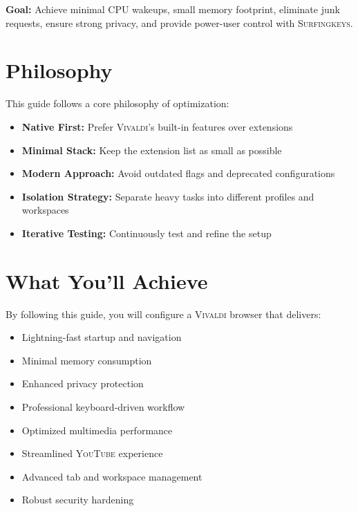 \documentclass[11pt,a4paper,oneside]{book}
\newcommand{\vivaldi}{\textsc{Vivaldi}}
\newcommand{\youtube}{\textsc{YouTube}}
\newcommand{\surfingkeys}{\textsc{Surfingkeys}}
\begin{document}
\begin{tipbox}
\textbf{Goal:} Achieve minimal CPU wakeups, small memory footprint, eliminate junk requests, ensure strong privacy, and provide power-user control with \surfingkeys{}.
\end{tipbox}

\section{Philosophy}

This guide follows a core philosophy of optimization:

\begin{itemize}
    \item \textbf{Native First:} Prefer \vivaldi{}'s built-in features over extensions
    \item \textbf{Minimal Stack:} Keep the extension list as small as possible
    \item \textbf{Modern Approach:} Avoid outdated flags and deprecated configurations
    \item \textbf{Isolation Strategy:} Separate heavy tasks into different profiles and workspaces
    \item \textbf{Iterative Testing:} Continuously test and refine the setup
\end{itemize}

\section{What You'll Achieve}

By following this guide, you will configure a \vivaldi{} browser that delivers:

\begin{multicols}{2}
\begin{itemize}
    \item Lightning-fast startup and navigation
    \item Minimal memory consumption
    \item Enhanced privacy protection
    \item Professional keyboard-driven workflow
    \item Optimized multimedia performance
    \item Streamlined \youtube{} experience
    \item Advanced tab and workspace management
    \item Robust security hardening
\end{itemize}
\end{multicols}
\end{document}
